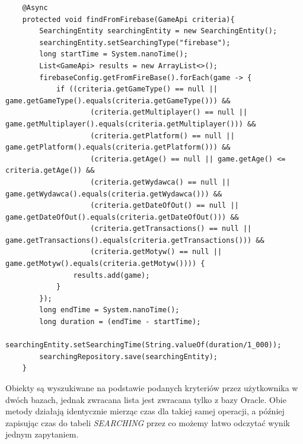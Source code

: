 \begin{lstlisting}
    @Async
    protected void findFromFirebase(GameApi criteria){
        SearchingEntity searchingEntity = new SearchingEntity();
        searchingEntity.setSearchingType("firebase");
        long startTime = System.nanoTime();
        List<GameApi> results = new ArrayList<>();
        firebaseConfig.getFromFireBase().forEach(game -> {
            if ((criteria.getGameType() == null || game.getGameType().equals(criteria.getGameType())) &&
                    (criteria.getMultiplayer() == null || game.getMultiplayer().equals(criteria.getMultiplayer())) &&
                    (criteria.getPlatform() == null || game.getPlatform().equals(criteria.getPlatform())) &&
                    (criteria.getAge() == null || game.getAge() <= criteria.getAge()) &&
                    (criteria.getWydawca() == null || game.getWydawca().equals(criteria.getWydawca())) &&
                    (criteria.getDateOfOut() == null || game.getDateOfOut().equals(criteria.getDateOfOut())) &&
                    (criteria.getTransactions() == null || game.getTransactions().equals(criteria.getTransactions())) &&
                    (criteria.getMotyw() == null || game.getMotyw().equals(criteria.getMotyw()))) {
                results.add(game);
            }
        });
        long endTime = System.nanoTime();
        long duration = (endTime - startTime);
        searchingEntity.setSearchingTime(String.valueOf(duration/1_000));
        searchingRepository.save(searchingEntity);
    }
\end{lstlisting}

Obiekty są wyszukiwane na podstawie podanych kryteriów przez użytkownika w dwóch bazach, jednak zwracana lista jest zwracana tylko z bazy Oracle. Obie metody działają identycznie mierząc czas dla takiej samej operacji, a później zapisując czas do tabeli \textit{SEARCHING} przez co możemy łatwo odczytać wynik jednym zapytaniem.

